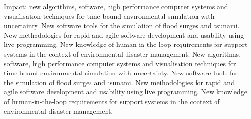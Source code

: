 \documentclass[a4paper,fontsize=12pt]{scrartcl}
\begin{document}
Impact: new algorithms, software, high performance computer systems
and visualisation techniques for time-bound environmental simulation
with uncertainty. New software tools for the simulation of flood
surges and tsunami. New methodologies for rapid and agile software
development and usability using live programming. New knowledge of
human-in-the-loop requirements for support systems in the context of
environmental disaster management. New algorithms, software, high
performance computer systems and visualisation techniques for
time-bound environmental simulation with uncertainty. New software
tools for the simulation of flood surges and tsunami. New
methodologies for rapid and agile software development and usability
using live programming. New knowledge of human-in-the-loop
requirements for support systems in the context of environmental
disaster management.


















\end{document}
